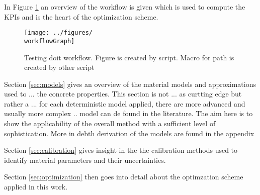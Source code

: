 In Figure \ref{fig:workflow} an overview of the workflow is given which is used to compute the KPIs and is the heart of the optimization scheme.
\begin{figure}[h]%
	\centering
	\texttt{[image: ../figures/\\workflowGraph]}
	\caption{Testing doit workflow. Figure is created by script. Macro for path is created by other script}\label{fig:workflow}
\end{figure}

Section \ref{sec:models} gives an overview of the material models and approximations used to ... the concrete properties.
This section is not ... as curtting edge but rather a ... 
for each deterministic model applied, there are more advanced and usually more complex .. model can de found in the literature.
The aim here is to show the applicability of the overall method with a sufficient level of sophistication.
More in debth derivation of the models are found in the appendix

Section \ref{sec:calibration} gives insight in the the calibration methods used to identify material parameters and their uncertainties.

Section \ref{sec:optimization} then goes into detail about the optimzation scheme applied in this work.

